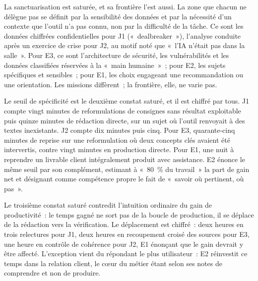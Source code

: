 La sanctuarisation est saturée, et sa frontière l'est aussi. La zone que chacun ne délègue
pas se définit par la sensibilité des données et par la nécessité d'un contexte que l'outil
n'a pas connu, non par la difficulté de la tâche. Ce sont les données chiffrées
confidentielles pour J1 («~dealbreaker~»), l'analyse conduite après un exercice de crise
pour J2, au motif noté que «~l'IA n'était pas dans la salle~». Pour E3, ce sont
l'architecture de sécurité, les vulnérabilités et les données classifiées réservées à la
«~main humaine~»~; pour E2, les sujets spécifiques et sensibles~; pour E1, les choix
engageant une recommandation ou une orientation. Les missions diffèrent~; la frontière,
elle, ne varie pas.

Le seuil de spécificité est le deuxième constat saturé, et il est chiffré par tous. J1
compte vingt minutes de reformulations de consignes sans résultat exploitable puis quinze
minutes de rédaction directe, sur un sujet où l'outil renvoyait à des textes inexistants.
J2 compte dix minutes puis cinq. Pour E3, quarante-cinq minutes de reprise sur une
reformulation où deux concepts clés avaient été intervertis, contre vingt minutes en
production directe. Pour E1, une nuit à reprendre un livrable client intégralement produit
avec assistance. E2 énonce le même seuil par son complément, estimant à «~80~\% du travail~» la part de gain net
et désignant comme compétence propre le fait de «~savoir où pertinent, où pas~».

Le troisième constat saturé contredit l'intuition ordinaire du gain de productivité~: le
temps gagné ne sort pas de la boucle de production, il se déplace de la rédaction vers la
vérification. Le déplacement est chiffré~: deux heures en trois relectures pour J1, deux
heures en recoupement croisé des sources pour E3, une heure en contrôle de cohérence pour J2,
E1 énonçant que le gain devrait y être affecté. L'exception vient du répondant le plus
utilisateur~: E2 réinvestit ce temps dans la relation client, le c\oe{}ur du métier étant
selon ses notes de comprendre et non de produire.

